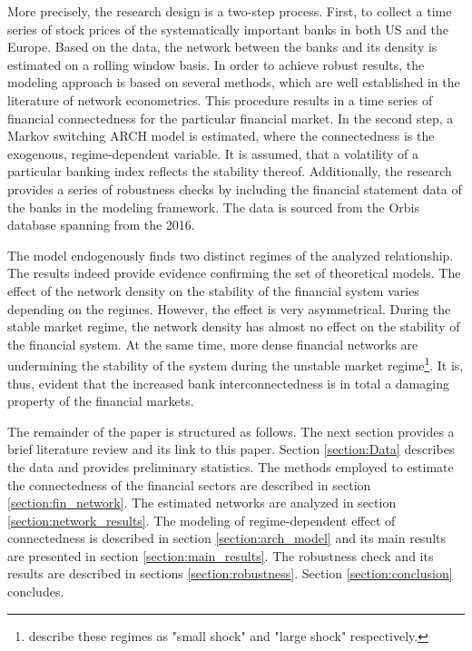 \documentclass[12pt]{article}
\begin{document}
More precisely, the research design is a two-step process. First, to collect a time series of stock prices of the systematically important banks in both US and the Europe. Based on the data, the network between the banks and its density is estimated on a rolling window basis. In order to achieve robust results, the modeling approach is based on several methods, which are well established in the literature of network econometrics. This procedure results in a time series of financial connectedness for the particular financial market. In the second step, a Markov switching ARCH model is estimated, where the connectedness is the exogenous, regime-dependent variable. It is assumed, that a volatility of a particular banking index reflects the stability thereof. Additionally, the research provides a series of robustness checks by including the financial statement data of the banks in the modeling framework. The data is sourced from the Orbis database spanning from the 2016.

The model endogenously finds two distinct regimes of the analyzed relationship. The results indeed provide evidence confirming the set of theoretical models. The effect of the network density on the stability of the financial system varies depending on the regimes. However, the effect is very asymmetrical. During the stable market regime, the network density has almost no effect on the stability of the financial system. At the same time, more dense financial networks are undermining the stability of the system during the unstable market regime\footnote{\cite{acemoglu13} describe these regimes as "small shock" and "large shock" respectively.}. It is, thus, evident that the increased bank interconnectedness is in total a damaging property of the financial markets. 

The remainder of the paper is structured as follows. The next section provides a brief literature review and its link to this paper. Section \ref{section:Data} describes the data and provides preliminary statistics. The methods employed to estimate the connectedness of the financial sectors are described in section \ref{section:fin_network}. The estimated networks are analyzed in section \ref{section:network_results}. The modeling of regime-dependent effect of connectedness is described in section \ref{section:arch_model} and its main results are presented in section \ref{section:main_results}. The robustness check and its results are described in sections \ref{section:robustness}. Section \ref{section:conclusion} concludes.
\end{document}
